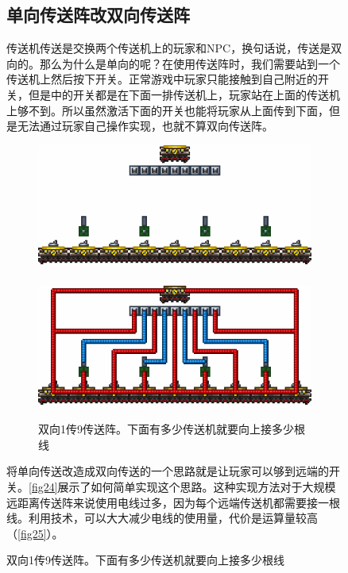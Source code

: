 \begin{figure}[!ht]
\subsection{单向传送阵改双向传送阵}
传送机传送是交换两个传送机上的玩家和NPC，换句话说，传送是双向的。那么为什么是单向的呢？在使用传送阵时，我们需要站到一个传送机上然后按下开关。正常游戏中玩家只能接触到自己附近的开关，但是中的开关都是在下面一排传送机上，玩家站在上面的传送机上够不到。所以虽然激活下面的开关也能将玩家从上面传到下面，但是无法通过玩家自己操作实现，也就不算双向传送阵。

\begin{figure}[!ht]
\centering
\includegraphics{images/391.png}\\
\mbox{}\\
\includegraphics{images/392.png}
\caption{双向1传9传送阵。下面有多少传送机就要向上接多少根线}\label{fig24}
\end{figure}

将单向传送改造成双向传送的一个思路就是让玩家可以够到远端的开关。\autoref{fig24}展示了如何简单实现这个思路。这种实现方法对于大规模远距离传送阵来说使用电线过多，因为每个远端传送机都需要接一根线。利用技术，可以大大减少电线的使用量，代价是运算量较高（\autoref{fig25}）。


\end{figure}
